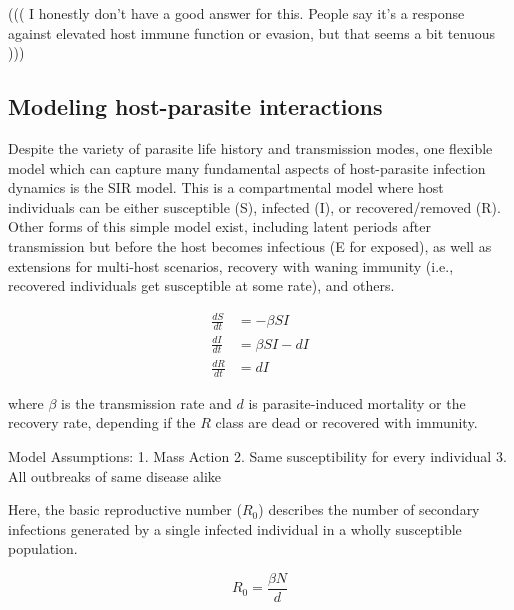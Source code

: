 \documentclass[12pt]{article}
\begin{document}
((( I honestly don't have a good answer for this. People say it's a response against elevated host immune function or evasion, but that seems a bit tenuous )))

























\bigskip
\subsection*{Modeling host-parasite interactions}

Despite the variety of parasite life history and transmission modes, one flexible model which can capture many fundamental aspects of host-parasite infection dynamics is the SIR model. This is a compartmental model where host individuals can be either susceptible (S), infected (I), or recovered/removed (R). Other forms of this simple model exist, including latent periods after transmission but before the host becomes infectious (E for exposed), as well as extensions for multi-host scenarios, recovery with waning immunity (i.e., recovered individuals get susceptible at some rate), and others. 


\begin{align}
\frac{dS}{dt} &=  -\beta SI\\
\frac{dI}{dt} &=  \beta SI - dI \\
\frac{dR}{dt} &=  dI
\end{align}


where $\beta$ is the transmission rate and $d$ is parasite-induced mortality or the recovery rate, depending if the $R$ class are dead or recovered with immunity. 


Model Assumptions:
1. Mass Action
2. Same susceptibility for every individual
3. All outbreaks of same disease alike


Here, the basic reproductive number ($R_0$) describes the number of secondary infections generated by a single infected individual in a wholly susceptible population. 


\begin{equation}
R_0 = \frac{\beta N}{d}
\end{equation}
\end{document}
